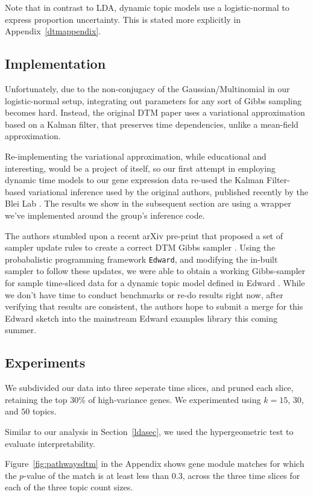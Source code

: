 \documentclass{article}
\begin{document}
Note that in contrast to LDA, dynamic topic models use a logistic-normal to express proportion uncertainty. This is stated more explicitly in Appendix~\ref{dtmappendix}.

\subsection{Implementation} 

Unfortunately, due to the non-conjugacy of the Gaussian/Multinomial in our logistic-normal setup, integrating out parameters for any sort of Gibbs sampling becomes hard. Instead, the original DTM paper uses a variational approximation based on a Kalman filter, that preserves time dependencies, unlike a mean-field approximation.

Re-implementing the variational approximation, while educational and interesting, would be a project of itself, so our first attempt in employing dynamic time models to our gene expression data re-used the Kalman Filter-based variational inference used by the original authors, published recently by the Blei Lab \cite{dtmbleigit}. The results we show in the subsequent section are using a wrapper we've implemented around the group's inference code.

The authors stumbled upon a recent arXiv pre-print that proposed a set of sampler update rules to create a correct DTM Gibbs sampler \cite{sdtm}. Using the probabalistic programming framework \texttt{Edward}, and modifying the in-built sampler to follow these updates, we were able to obtain a working Gibbs-sampler for sample time-sliced data for a dynamic topic model defined in Edward \cite{edward}. While we don't have time to conduct benchmarks or re-do results right now, after verifying that results are consistent, the authors hope to submit a merge for this Edward sketch into the mainstream Edward examples library this coming summer.

\subsection{Experiments} 
We subdivided our data into three seperate time slices, and pruned each slice, retaining the top 30\% of high-variance genes. We experimented using $k=15$, $30$, and $50$ topics.

Similar to our analysis in Section~\ref{ldasec}, we used the hypergeometric test to evaluate interpretability. 

Figure~\ref{fig:pathwaysdtm} in the Appendix shows gene module matches for which the $p$-value of the match is at least less than 0.3, across the three time slices for each of the three topic count sizes.
\end{document}
